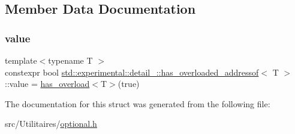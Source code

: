 \subsection{Member Data Documentation}
\mbox{\label{structstd_1_1experimental_1_1detail___1_1has__overloaded__addressof_a7ff16212ecdca54a0328b1cb4d676cf9}} 
\subsubsection{\texorpdfstring{value}{value}}
{\footnotesize\ttfamily template$<$typename T $>$ \\
constexpr bool \mbox{\hyperlink{structstd_1_1experimental_1_1detail___1_1has__overloaded__addressof}{std\+::experimental\+::detail\+\_\+\+::has\+\_\+overloaded\+\_\+addressof}}$<$ T $>$\+::value = \mbox{\hyperlink{structstd_1_1experimental_1_1detail___1_1has__overloaded__addressof_a4656eb4d63080eef6563dca4894f8623}{has\+\_\+overload}}$<$T$>$(true)\hspace{0.3cm}{\ttfamily [static]}}



The documentation for this struct was generated from the following file\+:\begin{DoxyCompactItemize}
\item 
src/\+Utilitaires/\mbox{\hyperlink{optional_8h}{optional.\+h}}\end{DoxyCompactItemize}
